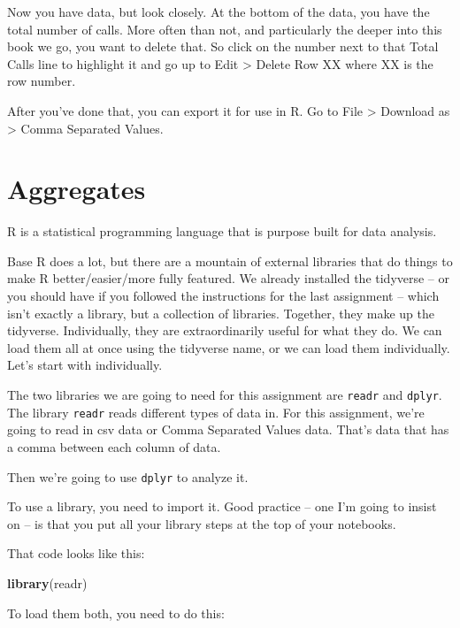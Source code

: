 \documentclass[]{book}
\newenvironment{Shaded}{\begin{snugshade}}{\end{snugshade}}
\newcommand{\KeywordTok}[1]{\textcolor[rgb]{0.13,0.29,0.53}{\textbf{#1}}}
\newcommand{\NormalTok}[1]{#1}
\begin{document}
Now you have data, but look closely. At the bottom of the data, you have the total number of calls. More often than not, and particularly the deeper into this book we go, you want to delete that. So click on the number next to that Total Calls line to highlight it and go up to Edit \textgreater{} Delete Row XX where XX is the row number.

After you've done that, you can export it for use in R. Go to File \textgreater{} Download as \textgreater{} Comma Separated Values.

\hypertarget{aggregates}{%
\chapter{Aggregates}\label{aggregates}}

R is a statistical programming language that is purpose built for data analysis.

Base R does a lot, but there are a mountain of external libraries that do things to make R better/easier/more fully featured. We already installed the tidyverse -- or you should have if you followed the instructions for the last assignment -- which isn't exactly a library, but a collection of libraries. Together, they make up the tidyverse. Individually, they are extraordinarily useful for what they do. We can load them all at once using the tidyverse name, or we can load them individually. Let's start with individually.

The two libraries we are going to need for this assignment are \texttt{readr} and \texttt{dplyr}. The library \texttt{readr} reads different types of data in. For this assignment, we're going to read in csv data or Comma Separated Values data. That's data that has a comma between each column of data.

Then we're going to use \texttt{dplyr} to analyze it.

To use a library, you need to import it. Good practice -- one I'm going to insist on -- is that you put all your library steps at the top of your notebooks.

That code looks like this:

\begin{Shaded}
\begin{Highlighting}[]
\KeywordTok{library}\NormalTok{(readr)}
\end{Highlighting}
\end{Shaded}

To load them both, you need to do this:
\end{document}
